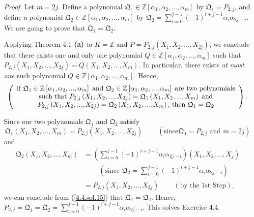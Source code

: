 \documentclass[numbers=enddot,12pt,final,onecolumn,notitlepage]{scrartcl}%
\begin{document}
\textit{Proof.} Let $m=2j$. Define a polynomial $\mathfrak{Q}_{1}\in
\mathbb{Z}\left[  \alpha_{1},\alpha_{2},...,\alpha_{m}\right]  $ by
$\mathfrak{Q}_{1}=P_{2,j}$, and define a polynomial $\mathfrak{Q}_{2}%
\in\mathbb{Z}\left[  \alpha_{1},\alpha_{2},...,\alpha_{m}\right]  $ by
$\mathfrak{Q}_{2}=\sum\limits_{i=0}^{j-1}\left(  -1\right)  ^{i+j-1}\alpha
_{i}\alpha_{2j-i}$. We are going to prove that $\mathfrak{Q}_{1}%
=\mathfrak{Q}_{2}$.

Applying Theorem 4.1 \textbf{(a)} to $K=\mathbb{Z}$ and $P=P_{2,j}\left(
X_{1},X_{2},...,X_{2j}\right)  $, we conclude that there exists one and only
one polynomial $Q\in\mathbb{Z}\left[  \alpha_{1},\alpha_{2},...,\alpha
_{m}\right]  $ such that $P_{2,j}\left(  X_{1},X_{2},...,X_{2j}\right)
=Q\left(  X_{1},X_{2},...,X_{m}\right)  $. In particular, there exists
\textit{at most one} such polynomial $Q\in\mathbb{Z}\left[  \alpha_{1}%
,\alpha_{2},...,\alpha_{m}\right]  $. Hence,
\begin{equation}
\left(
\begin{array}
[c]{c}%
\text{if }\mathfrak{Q}_{1}\in\mathbb{Z}\left[  \alpha_{1},\alpha
_{2},...,\alpha_{m}\right]  \text{ and }\mathfrak{Q}_{2}\in\mathbb{Z}\left[
\alpha_{1},\alpha_{2},...,\alpha_{m}\right]  \text{ are two polynomials}\\
\text{such that }P_{2,j}\left(  X_{1},X_{2},...,X_{2j}\right)  =\mathfrak{Q}%
_{1}\left(  X_{1},X_{2},...,X_{m}\right)  \text{ and}\\
P_{2,j}\left(  X_{1},X_{2},...,X_{2j}\right)  =\mathfrak{Q}_{2}\left(
X_{1},X_{2},...,X_{m}\right)  \text{, then }\mathfrak{Q}_{1}=\mathfrak{Q}_{2}%
\end{array}
\right)  . \label{4.4.sol.15}%
\end{equation}


Since our two polynomials $\mathfrak{Q}_{1}$ and $\mathfrak{Q}_{2}$ satisfy%
\[
\mathfrak{Q}_{1}\left(  X_{1},X_{2},...,X_{m}\right)  =P_{2,j}\left(
X_{1},X_{2},...,X_{2j}\right)  \ \ \ \ \ \ \ \ \ \ \left(  \text{since
}\mathfrak{Q}_{1}=P_{2,j}\text{ and }m=2j\right)
\]
and%
\begin{align*}
\mathfrak{Q}_{2}\left(  X_{1},X_{2},...,X_{m}\right)   &  =\left(
\sum\limits_{i=0}^{j-1}\left(  -1\right)  ^{i+j-1}\alpha_{i}\alpha
_{2j-i}\right)  \left(  X_{1},X_{2},...,X_{j}\right) \\
&  \ \ \ \ \ \ \ \ \ \ \left(  \text{since }\mathfrak{Q}_{2}=\sum
\limits_{i=0}^{j-1}\left(  -1\right)  ^{i+j-1}\alpha_{i}\alpha_{2j-i}\right)
\\
&  =P_{2,j}\left(  X_{1},X_{2},...,X_{2j}\right)  \ \ \ \ \ \ \ \ \ \ \left(
\text{by the 1st Step}\right)  ,
\end{align*}
we can conclude from (\ref{4.4.sol.15}) that $\mathfrak{Q}_{1}=\mathfrak{Q}%
_{2}$. Hence, $P_{2,j}=\mathfrak{Q}_{1}=\mathfrak{Q}_{2}=\sum\limits_{i=0}%
^{j-1}\left(  -1\right)  ^{i+j-1}\alpha_{i}\alpha_{2j-i}$. This solves
Exercise 4.4.
\end{document}
